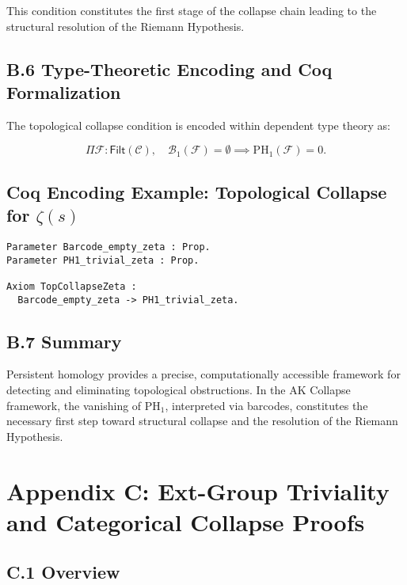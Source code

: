 \documentclass[11pt]{article}
\begin{document}
This condition constitutes the first stage of the collapse chain leading to the structural resolution of the Riemann Hypothesis.

\subsection*{B.6 Type-Theoretic Encoding and Coq Formalization}

The topological collapse condition is encoded within dependent type theory as:

\[
\Pi \mathcal{F} : \mathsf{Filt}(\mathcal{C}), \quad \mathcal{B}_1(\mathcal{F}) = \emptyset \implies \mathrm{PH}_1(\mathcal{F}) = 0.
\]

\subsection*{Coq Encoding Example: Topological Collapse for $\zeta(s)$}

\begin{lstlisting}[language=Coq, caption=Coq Formalization of Topological Collapse for $\zeta(s)$, captionpos=b]
Parameter Barcode_empty_zeta : Prop.
Parameter PH1_trivial_zeta : Prop.

Axiom TopCollapseZeta :
  Barcode_empty_zeta -> PH1_trivial_zeta.
\end{lstlisting}

\subsection*{B.7 Summary}

Persistent homology provides a precise, computationally accessible framework for detecting and eliminating topological obstructions. In the AK Collapse framework, the vanishing of $\mathrm{PH}_1$, interpreted via barcodes, constitutes the necessary first step toward structural collapse and the resolution of the Riemann Hypothesis.



\section*{Appendix C: Ext-Group Triviality and Categorical Collapse Proofs}

\subsection*{C.1 Overview}
\end{document}

